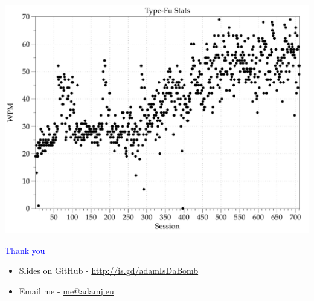 \documentclass[landscape]{slides}
\begin{document}
\begin{slide}

    \includegraphics[width=\textwidth]{type-fu}

\end{slide}


\begin{slide}
    \textcolor{blue}{\Large{Thank you}}

    \begin{itemize}
        \item Slides on GitHub - \url{http://is.gd/adamIsDaBomb}
        \item Email me - \url{me@adamj.eu}
    \end{itemize}

\end{slide}
\end{document}
